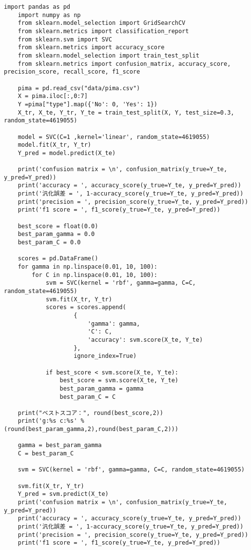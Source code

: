 \documentclass[12pt]{jarticle}
\begin{document}
\begin{lstlisting}[style = py,caption=レポート課題2]
    import pandas as pd
    import numpy as np
    from sklearn.model_selection import GridSearchCV
    from sklearn.metrics import classification_report
    from sklearn.svm import SVC
    from sklearn.metrics import accuracy_score
    from sklearn.model_selection import train_test_split
    from sklearn.metrics import confusion_matrix, accuracy_score, precision_score, recall_score, f1_score
    
    pima = pd.read_csv("data/pima.csv")
    X = pima.iloc[:,0:7]
    Y =pima["type"].map({'No': 0, 'Yes': 1})
    X_tr, X_te, Y_tr, Y_te = train_test_split(X, Y, test_size=0.3, random_state=4619055)
    
    model = SVC(C=1 ,kernel='linear', random_state=4619055)
    model.fit(X_tr, Y_tr)
    Y_pred = model.predict(X_te)    
    
    print('confusion matrix = \n', confusion_matrix(y_true=Y_te, y_pred=Y_pred))
    print('accuracy = ', accuracy_score(y_true=Y_te, y_pred=Y_pred))
    print('汎化誤差 = ', 1-accuracy_score(y_true=Y_te, y_pred=Y_pred))
    print('precision = ', precision_score(y_true=Y_te, y_pred=Y_pred))
    print('f1 score = ', f1_score(y_true=Y_te, y_pred=Y_pred))
    
    best_score = float(0.0)
    best_param_gamma = 0.0
    best_param_C = 0.0
     
    scores = pd.DataFrame()
    for gamma in np.linspace(0.01, 10, 100):
        for C in np.linspace(0.01, 10, 100):
            svm = SVC(kernel = 'rbf', gamma=gamma, C=C, random_state=4619055)
            svm.fit(X_tr, Y_tr)
            scores = scores.append(
                    {
                        'gamma': gamma,
                        'C': C,
                        'accuracy': svm.score(X_te, Y_te)
                    },
                    ignore_index=True)
            
            if best_score < svm.score(X_te, Y_te):
                best_score = svm.score(X_te, Y_te)
                best_param_gamma = gamma
                best_param_C = C
                
    print("ベストスコア：", round(best_score,2))
    print('g:%s c:%s' %(round(best_param_gamma,2),round(best_param_C,2)))
    
    gamma = best_param_gamma
    C = best_param_C
     
    svm = SVC(kernel = 'rbf', gamma=gamma, C=C, random_state=4619055)
     
    svm.fit(X_tr, Y_tr)
    Y_pred = svm.predict(X_te)
    print('confusion matrix = \n', confusion_matrix(y_true=Y_te, y_pred=Y_pred))
    print('accuracy = ', accuracy_score(y_true=Y_te, y_pred=Y_pred))
    print('汎化誤差 = ', 1-accuracy_score(y_true=Y_te, y_pred=Y_pred))
    print('precision = ', precision_score(y_true=Y_te, y_pred=Y_pred))
    print('f1 score = ', f1_score(y_true=Y_te, y_pred=Y_pred))
\end{lstlisting}

\begin{lstlisting}[style = py,caption=レポート課題3]
 
\end{lstlisting}

\begin{lstlisting}[style = py,caption=レポート課題4]
 
\end{lstlisting}

\end{document}
